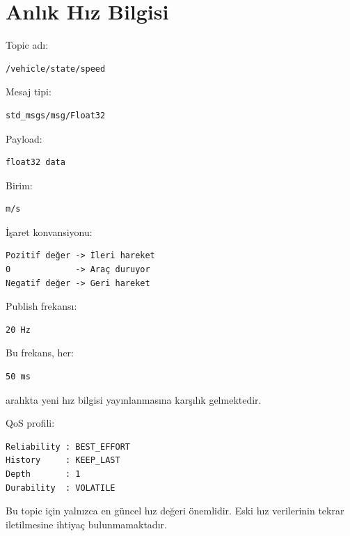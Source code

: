 \documentclass[12pt,a4paper]{article}
\begin{document}
\clearpage

\section{Anlık Hız Bilgisi}

Topic adı:

\begin{verbatim}
/vehicle/state/speed
\end{verbatim}

Mesaj tipi:

\begin{verbatim}
std_msgs/msg/Float32
\end{verbatim}

Payload:

\begin{verbatim}
float32 data
\end{verbatim}

Birim:

\begin{verbatim}
m/s
\end{verbatim}

İşaret konvansiyonu:

\begin{verbatim}
Pozitif değer -> İleri hareket
0             -> Araç duruyor
Negatif değer -> Geri hareket
\end{verbatim}

Publish frekansı:

\begin{verbatim}
20 Hz
\end{verbatim}

Bu frekans, her:

\begin{verbatim}
50 ms
\end{verbatim}

aralıkta yeni hız bilgisi yayınlanmasına karşılık gelmektedir.

QoS profili:

\begin{verbatim}
Reliability : BEST_EFFORT
History     : KEEP_LAST
Depth       : 1
Durability  : VOLATILE
\end{verbatim}

Bu topic için yalnızca en güncel hız değeri önemlidir.
Eski hız verilerinin tekrar iletilmesine ihtiyaç bulunmamaktadır.

\end{document}
